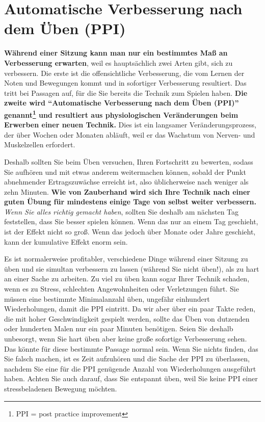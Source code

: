 
\section{Automatische Verbesserung nach dem Üben (PPI)}\hypertarget{c1ii15}{}

\textbf{Während einer Sitzung kann man nur ein bestimmtes Maß an Verbesserung erwarten}, weil es hauptsächlich zwei Arten gibt, sich zu verbessern.
Die erste ist die offensichtliche Verbesserung, die vom Lernen der Noten und Bewegungen kommt und in sofortiger Verbesserung resultiert.
Das tritt bei Passagen auf, für die Sie bereits die Technik zum Spielen haben.
\textbf{Die zweite wird \enquote{Automatische Verbesserung nach dem Üben (PPI)} genannt\footnote{PPI = post practice improvement} und resultiert aus physiologischen Veränderungen beim Erwerben einer neuen Technik.}
Dies ist ein langsamer Veränderungsprozess, der über Wochen oder Monaten abläuft, weil er das Wachstum von Nerven- und Muskelzellen erfordert.

Deshalb sollten Sie beim Üben versuchen, Ihren Fortschritt zu bewerten, sodass Sie aufhören und mit etwas anderem weitermachen können, sobald der Punkt abnehmender Ertragszuwächse erreicht ist, also üblicherweise nach weniger als zehn Minuten.
\textbf{Wie von Zauberhand wird sich Ihre Technik nach einer guten Übung für mindestens einige Tage von selbst weiter verbessern.}
\textit{Wenn Sie alles richtig gemacht haben}, sollten Sie deshalb am nächsten Tag feststellen, dass Sie besser spielen können.
Wenn das nur an einem Tag geschieht, ist der Effekt nicht so groß. Wenn das jedoch über Monate oder Jahre geschieht, kann der kumulative Effekt enorm sein.

Es ist normalerweise profitabler, verschiedene Dinge während einer Sitzung zu üben und sie simultan verbessern zu lassen (während Sie nicht üben!), als zu hart an einer Sache zu arbeiten.
Zu viel zu üben kann sogar Ihrer Technik schaden, wenn es zu Stress, schlechten Angewohnheiten oder Verletzungen führt.
Sie müssen eine bestimmte Minimalanzahl üben, ungefähr einhundert Wiederholungen, damit die PPI eintritt.
Da wir aber über ein paar Takte reden, die mit hoher Geschwindigkeit gespielt werden, sollte das Üben von dutzenden oder hunderten Malen nur ein paar Minuten benötigen.
Seien Sie deshalb unbesorgt, wenn Sie hart üben aber keine große sofortige Verbesserung sehen.
Das könnte für diese bestimmte Passage normal sein.
Wenn Sie nichts finden, das Sie falsch machen, ist es Zeit aufzuhören und die Sache der PPI zu überlassen, nachdem Sie eine für die PPI genügende Anzahl von Wiederholungen ausgeführt haben.
Achten Sie auch darauf, dass Sie entspannt üben, weil Sie keine PPI einer stressbeladenen Bewegung möchten.

